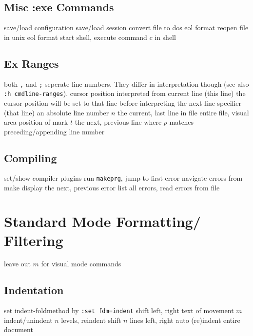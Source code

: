 \subsection{Misc :exe Commands}	{}
	{save/load configuration}
	{save/load session}
	{convert file to dos eol format}
	{reopen file in unix eol format}
	{start shell, execute command $c$ in shell}

\subsection{Ex Ranges}	{both {\tt ,} and {\tt ;} seperate line numbers. They differ in interpretation though (see also {\tt :h cmdline-ranges}).}
\cmdOper{, }	{cursor position interpreted from current line (this line)}
\cmdOper{;\ }	{the cursor position will be set to that line before interpreting the next line specifier (that line)}
	{an absolute line number $n$}
	{the current, last line in file}
\cmdOper{\% * }	{entire file, visual area}
	{position of mark $t$}
	{the next, previous line where $p$ matches}
	{preceding/appending line number}

\subsection{Compiling}	{}
	{set/show compiler plugins}
	{run {\tt makeprg}, jump to first error}
	{navigate errors from make}
	{display the next, previous error}
	{list all errors, read errors from file}

\section{Standard Mode Formatting/ Filtering}	{leave out $m$ for visual mode commands}

\subsection{Indentation}{set indent-foldmethod by {\tt :set fdm=indent}}
	{shift left, right text of movement $m$}
	{indent/unindent $n$ levels, reindent}
	{shift $n$ lines left, right}
	{auto (re)indent entire document}

